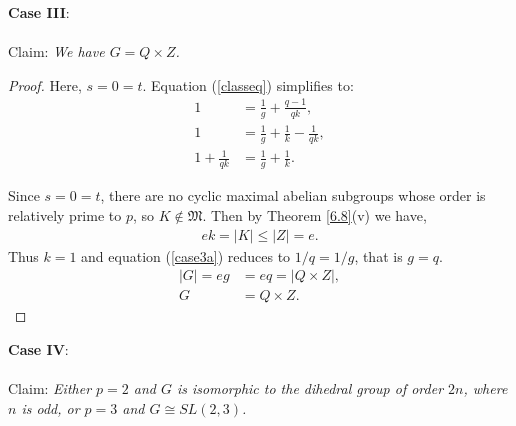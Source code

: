 \vspace{-1mm}
\textbf{Case III}:\\
\\
Claim: \textit{We have $G = Q \times Z$.}
\\
\begin{proof} Here, $s = 0 = t$. Equation (\ref{classeq}) simplifies to:
\begin{align}\label{case3a} 1 &= \frac{1}{g} + \frac{q-1}{qk}, \nonumber
\\ 1 &= \frac{1}{g} + \frac{1}{k} - \frac{1}{qk}, \nonumber
\\ 1 + \frac{1}{qk} &= \frac{1}{g} + \frac{1}{k}.
\end{align}

Since $s = 0 = t$, there are no cyclic maximal abelian subgroups whose order is relatively prime to $p$, so $K \not \in \mathfrak{M}$. Then by Theorem \ref{6.8}(v) we have,
\begin{align*} ek = |K| \leq |Z| = e.
\end{align*} 
Thus $k = 1$ and equation (\ref{case3a}) reduces to $1/q = 1/g$, that is $g=q$.
\begin{align*} |G| =  eg &= eq = |Q \times Z|,
\\ G &= Q \times Z.
\end{align*}
\qedhere
\end{proof}
\vspace{-1mm}
\textbf{Case IV}:\\
\\
Claim: \textit{Either $p=2$ and $G$ is isomorphic to the dihedral group of order $2n$, where $n$ is odd, or $p=3$ and $G \cong SL(2,3)$.}
\\
